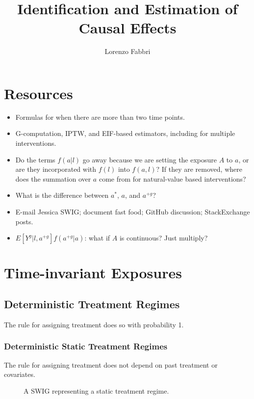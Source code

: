 \documentclass[12pt,twoside]{article}
\title{Identification and Estimation of Causal Effects}
\author{
    Lorenzo Fabbri
}
\begin{document}
\maketitle
\tableofcontents

\section{Resources}

\begin{itemize}
    \item Formulas for when there are more than two time points.
    \item G-computation, IPTW, and EIF-based estimators, including for multiple interventions.
    \item Do the terms $f(a|l)$ go away because we are setting the exposure $A$ to $a$, or are they incorporated with $f(l)$ into $f(a,l)$? If they are removed, where does the summation over $a$ come from for natural-value based interventions?
    \item What is the difference between $a^*$, $a$, and $a^{+g}$?
    \item E-mail Jessica SWIG; document fast food; GitHub discussion; StackExchange posts.
    \item $E[Y^g|l,a^{+g}]f(a^{+g}|a)$: what if $A$ is continuous? Just multiply?
\end{itemize}

\section{Time-invariant Exposures}

\subsection{Deterministic Treatment Regimes}
The rule for assigning treatment does so with probability 1.

\subsubsection{Deterministic Static Treatment Regimes}
The rule for assigning treatment does not depend on past treatment or covariates.

\begin{figure}[ht]
\centering
{}
\caption{A SWIG representing a static treatment regime.}
\label{fig:swig_det_stat_inv}
\end{figure}
\end{document}

